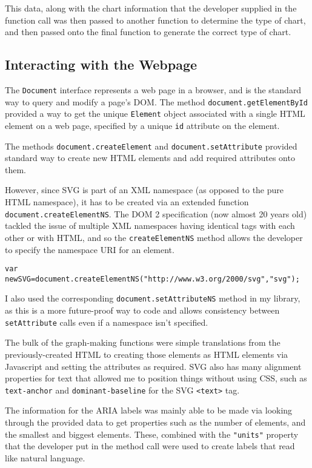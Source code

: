 \documentclass[ %
                    author={Aleena Baig},
                supervisor={Dr Simon Lock},
                    degree={BSc},
                     title={On Making Web Accessible Graphs},
                  subtitle={},
                      year={2019} ]{dissertation}
\begin{document}
This data, along with the chart information that the developer supplied in the function call was then passed to another function to determine the type of chart, and then passed onto the final function to generate the correct type of chart.

\subsection{Interacting with the Webpage}

The \texttt{Document} interface represents a web page in a browser, and is the standard way to query and modify a page's DOM. The method \texttt{document.getElementById} provided a way to get the unique \texttt{Element} object associated with a single HTML element on a web page, specified by a unique \texttt{id} attribute on the element.


The methods \texttt{document.createElement} and \texttt{document.setAttribute} provided standard way to create new HTML elements and add required attributes onto them.

However, since SVG is part of an XML namespace (as opposed to the pure HTML namespace), it has to be created via an extended function \texttt{document.createElementNS}. The DOM 2 specification (now almost 20 years old) tackled the issue of multiple XML namespaces having identical tags with each other or with HTML, and so the \texttt{createElementNS} method allows the developer to specify the namespace URI for an element.

\begin{lstlisting}
var newSVG=document.createElementNS("http://www.w3.org/2000/svg","svg");
\end{lstlisting}

I also used the corresponding \texttt{document.setAttributeNS} method in my library, as this is a more future-proof way to code and allows consistency between \texttt{setAttribute} calls even if a namespace isn't specified.

The bulk of the graph-making functions were simple translations from the previously-created HTML to creating those elements as HTML elements via Javascript and setting the attributes as required. SVG also has many alignment properties for text that allowed me to position things without using CSS, such as \texttt{text-anchor} and \texttt{dominant-baseline} for the SVG \texttt{<text>} tag.

The information for the ARIA labels was mainly able to be made via looking through the provided data to get properties such as the number of elements, and the smallest and biggest elements. These, combined with the \texttt{"units"} property that the developer put in the method call were used to create labels that read like natural language.
\end{document}
